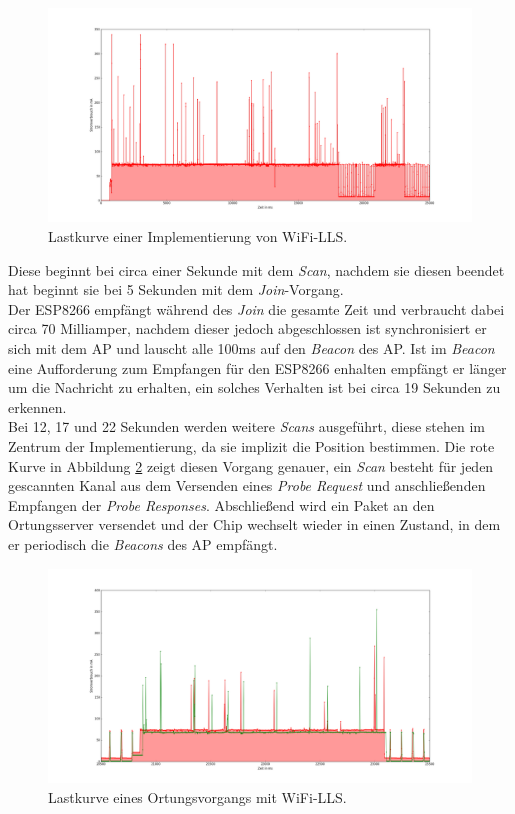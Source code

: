 \begin{figure}[h!]
  \centering
	\includegraphics[width=\textwidth]{plots/wifills.png}
  \caption{Lastkurve einer Implementierung von WiFi-LLS.}
  \label{fig:wifills}
\end{figure}

Diese beginnt bei circa einer Sekunde mit dem \emph{Scan}, nachdem sie diesen beendet hat beginnt sie bei 5 Sekunden mit dem \emph{Join}-Vorgang.\\
Der ESP8266 empfängt während des \emph{Join} die gesamte Zeit und verbraucht dabei circa 70 Milliamper, nachdem dieser jedoch abgeschlossen ist synchronisiert er sich mit dem AP und lauscht alle 100ms auf den \emph{Beacon} des AP.
Ist im \emph{Beacon} eine Aufforderung zum Empfangen für den ESP8266 enhalten empfängt er länger um die Nachricht zu erhalten, ein solches Verhalten ist bei circa 19 Sekunden zu erkennen.\\
Bei 12, 17 und 22 Sekunden werden weitere \emph{Scans} ausgeführt, diese stehen im Zentrum der Implementierung, da sie implizit die Position bestimmen.
Die rote Kurve in Abbildung \ref{fig:wifillssendv} zeigt diesen Vorgang genauer, ein \emph{Scan} besteht für jeden gescannten Kanal aus dem Versenden eines \emph{Probe Request} und anschließenden Empfangen der \emph{Probe Responses}. 
Abschließend wird ein Paket an den Ortungsserver versendet und der Chip wechselt wieder in einen Zustand, in dem er periodisch die \emph{Beacons} des AP empfängt.\\

\begin{figure}[h!]
  \centering
	\includegraphics[width=\textwidth]{plots/wifillssendv.png}
  \caption{Lastkurve eines Ortungsvorgangs mit WiFi-LLS.}
  \label{fig:wifillssendv}
\end{figure}

